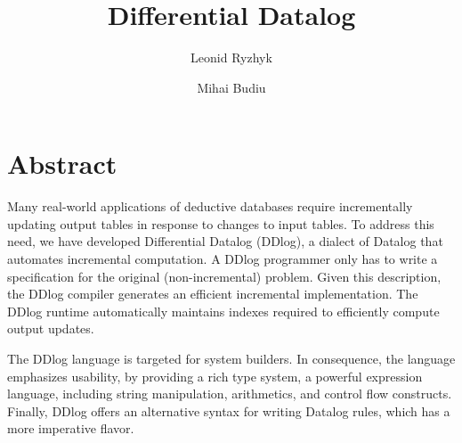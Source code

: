 \documentclass{svproc}
\author{
        Leonid Ryzhyk \and
        Mihai Budiu}
\institute{VMware Research}
\title{Differential Datalog}
\date{}
\begin{document}
\maketitle

\section{Abstract}



Many real-world applications of deductive databases require
incrementally updating output tables in response to changes to input
tables.
To address this need, we have developed Differential Datalog
(DDlog), a dialect of Datalog that automates incremental computation.
A DDlog programmer only has to write a specification for the
original (non-incremental) problem.  Given this description, the DDlog
compiler generates an efficient incremental implementation.  The DDlog
runtime automatically maintains indexes required to efficiently
compute output updates.

The DDlog language is targeted for system builders.  In consequence,
the language emphasizes usability, by providing a rich type system,
a powerful expression language, including string manipulation, arithmetics,
and control flow constructs.  Finally, DDlog offers an
alternative syntax for writing Datalog rules, which has a more
imperative flavor.










\end{document}
